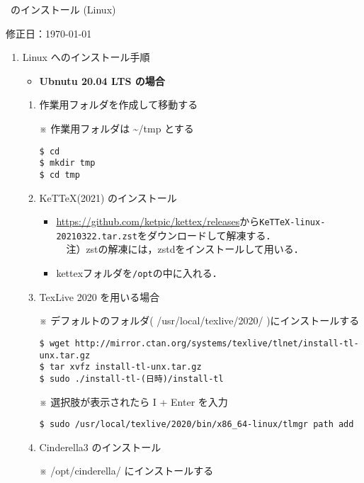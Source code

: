 \documentclass{ujarticle}
\begin{document}
\begin{center}
\ketcindy\ のインストール (Linux)
\end{center}

\hfill 修正日：\today

\begin{enumerate}[\bf\large 1.]
\item Linux へのインストール手順

\begin{itemize}
\item {\bf Ubnutu 20.04 LTS の場合}
\end{itemize}

\begin{enumerate}[(1)]

\item 作業用フォルダを作成して移動する

※ 作業用フォルダは \textasciitilde/tmp とする

\begin{verbatim}
$ cd
$ mkdir tmp
$ cd tmp
\end{verbatim}

\item KeTTeX(2021) のインストール

\begin{itemize}
\item \url{https://github.com/ketpic/kettex/releases}から\verb|KeTTeX-linux-20210322.tar.zst|をダウンロードして解凍する．\\
　注）zstの解凍には，zstdをインストールして用いる．
\item kettexフォルダを\verb|/opt|の中に入れる．
\end{itemize}

\item TexLive 2020 を用いる場合

※ デフォルトのフォルダ( /usr/local/texlive/2020/ )にインストールする

\begin{verbatim}
$ wget http://mirror.ctan.org/systems/texlive/tlnet/install-tl-unx.tar.gz
$ tar xvfz install-tl-unx.tar.gz
$ sudo ./install-tl-(日時)/install-tl
\end{verbatim}

※ 選択肢が表示されたら I + Enter を入力

\verb|$ sudo /usr/local/texlive/2020/bin/x86_64-linux/tlmgr path add|

\item Cinderella3 のインストール

※ /opt/cinderella/ にインストールする


\end{enumerate}
\end{enumerate}
\end{document}
